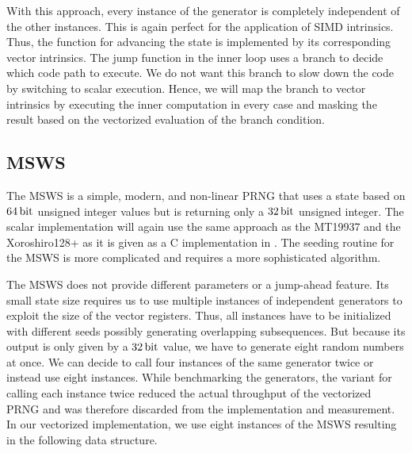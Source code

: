 \documentclass{stdlocal}
\begin{document}

    With this approach, every instance of the generator is completely independent of the other instances.
    This is again perfect for the application of SIMD intrinsics.
    Thus, the function for advancing the state is implemented by its corresponding vector intrinsics.
    The jump function in the inner loop uses a branch to decide which code path to execute.
    We do not want this branch to slow down the code by switching to scalar execution.
    Hence, we will map the branch to vector intrinsics by executing the inner computation in every case and masking the result based on the vectorized evaluation of the branch condition.



  \subsection{MSWS} %
  \label{sub:middle_square_weyl_generator}
    The MSWS is a simple, modern, and non-linear PRNG that uses a state based on $64\, \mathrm{bit}$ unsigned integer values but is returning only a $32\, \mathrm{bit}$ unsigned integer.
    The scalar implementation will again use the same approach as the MT19937 and the Xoroshiro128+ as it is given as a C implementation in \textcite{widynski2019}.
    The seeding routine for the MSWS is more complicated and requires a more sophisticated algorithm.

    The MSWS does not provide different parameters or a jump-ahead feature.
    Its small state size requires us to use multiple instances of independent generators to exploit the size of the vector registers.
    Thus, all instances have to be initialized with different seeds possibly generating overlapping subsequences.
    But because its output is only given by a $32\, \mathrm{bit}$ value, we have to generate eight random numbers at once.
    We can decide to call four instances of the same generator twice or instead use eight instances.
    While benchmarking the generators, the variant for calling each instance twice reduced the actual throughput of the vectorized PRNG and was therefore discarded from the implementation and measurement.
    In our vectorized implementation, we use eight instances of the MSWS resulting in the following data structure.
\end{document}
